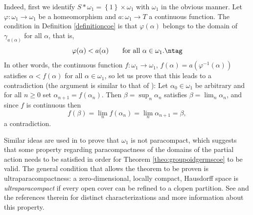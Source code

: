 \begin{example}
Indeed, first we identify $S\ast\omega_1=\left\{1\right\}\times\omega_1$ with $\omega_1$ in the obvious manner. Let $\varphi:\omega_1\to\omega_1$ be a homeomorphism and $a:\omega_1\to T$ a continuous function. The condition in Definition \ref{definitioncoe} is that $\varphi(\alpha)$ belongs to the domain of $\gamma_{a(\alpha)}$ for all $\alpha$, that is,
\[\varphi(\alpha)<a(\alpha)\qquad\text{for all }\alpha\in\omega_1.\ntag\label{equationomega1isbad}\]
In other words, the continuous function $f:\omega_1\to\omega_1$, $f(\alpha)=a(\varphi^{-1}(\alpha))$ satisfies $\alpha<f(\alpha)$ for all $\alpha\in\omega_1$, so let us prove that this leads to a contradiction (the argument is similar to that of \cite[Example 20.11]{MR0264581}): Let $\alpha_0\in\omega_1$ be arbitrary and for all $n\geq 0$ set $\alpha_{n+1}=f(\alpha_n)$. Then $\beta=\sup_n\alpha_n$ satisfies $\beta=\lim_n\alpha_n$, and since $f$ is continuous then
\[f(\beta)=\lim_n f(\alpha_n)=\lim_n\alpha_{n+1}=\beta,\]
a contradiction.%
%
%
%
\end{example}

Similar ideas are used in \cite[Example 20.11]{MR0264581} to prove that $\omega_1$ is not paracompact, which suggests that some property regarding paracompactness of the domains of the partial action needs to be satisfied in order for Theorem \ref{theo:groupoidgermscoe} to be valid. The general condition that allows the theorem to be proven is ultraparacompactness: a zero-dimensional, locally compact, Hausdorff space is \emph{ultraparacompact} if every open cover can be refined to a clopen partition. See \cite{MR0261565} and the references therein for distinct characterizations and more information about this property.

